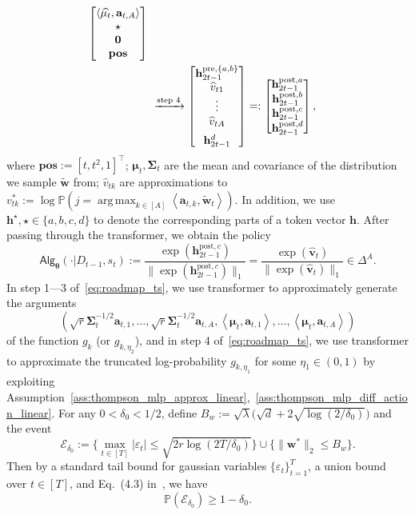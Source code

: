 \documentclass[10pt]{article}
\renewcommand{\hat}{\widehat}
\newcommand{\eps}{\varepsilon}
\DeclareMathOperator*{\argmax}{arg\,max}
\newcommand{\<}{\left\langle}
\renewcommand{\>}{\right\rangle}
\newcommand{\bzero}{{\mathbf 0}}
\renewcommand{\P}{\mathbb{P}}
\newcommand{\pre}{{\mathrm{pre}}}
\newcommand{\posv}{{\mathbf{pos}}}
\newcommand{\post}{{\mathrm{post}}}
\newcommand{\parta}{{a}}
\newcommand{\partb}{{b}}
\newcommand{\partc}{{c}}
\newcommand{\partd}{{d}}
\newcommand{\Tpsmean}{{{\mathbf\mu}}}
\newcommand{\Tpscov}{{{\mathbf\Sigma}}}
\newcommand{\Tpssam}{{\tilde\bw}}
\newcommand{\Tpsparn}{{r}}
\newcommand{\trunprob}{{\eta_1}}
\newcommand{\hpevent}{{\mathcal E}}
\newcommand{\Trunregpa}{{\eta_2}}
\newcommand{\state}{{s}}
\newcommand{\totlen}{{T}}
\newcommand{\sAlg}{{\mathsf{Alg}}}
\newcommand{\dset}{{D}}
\newcommand{\tfpar}{{\btheta}}
\def\btheta{{\boldsymbol \theta}}
\def\ba{{\mathbf a}}
\def\bh{{\mathbf h}}
\def\bv{{\mathbf v}}
\def\bw{{\mathbf w}}
\begin{document}
\begin{align}
\begin{bmatrix}
        \<\widehat{\Tpsmean_t},\ba_{t,A}\>
        \\
        \star\\ \bzero \\\posv
\end{bmatrix}
\\ &~\xrightarrow{\text{step 4}}
\begin{bmatrix}
    \bh_{2t-1}^{\pre,\{\parta,\partb\}}\\ \hat v_{t1}\\\vdots\\ \hat{v}_{tA} \vspace{0.5em}\\ \bh_{2t-1}^{\partd}
\end{bmatrix}
=:
\begin{bmatrix}
    \bh_{2t-1}^{\post,\parta} \\  \bh_{2t-1}^{\post,\partb}\\  \bh_{2t-1}^{\post,\partc}\\   \bh_{2t-1}^{\post,\partd}
\end{bmatrix},\notag
\end{align}
where $\posv:=[t,t^2,1]^\top$; $\Tpsmean_t,\Tpscov_t$ are the mean and covariance of the distribution we sample $\tilde\bw$ from; $\hat v_{tk}$ are approximations to $v^*_{tk}:=\log \P(j=\argmax_{k\in[A]}\<\ba_{t,k},\Tpssam_t\>)$. In addition, we use $\bh^\star,\star\in\{\parta,\partb,\partc,\partd\}$ to denote the corresponding parts of a token vector $\bh$. After passing through the transformer, we obtain the policy
$$
\sAlg_\tfpar(\cdot|\dset_{t-1},\state_t):=\frac{\exp(\bh^{\post,\partc}_{2t-1})}{\|\exp(\bh^{\post,\partc}_{2t-1})\|_1}=\frac{\exp(\hat \bv_t)}{\|\exp(\hat \bv_t)\|_1}\in\Delta^A.
$$
In step 1---3 of~\eqref{eq:roadmap_ts},  we use transformer to approximately generate the arguments $$(\sqrt{\Tpsparn}\Tpscov_t^{-1/2}\ba_{t,1},\ldots,\sqrt{\Tpsparn}\Tpscov_t^{-1/2}\ba_{t,A},\<\Tpsmean_t,\ba_{t,1}\>,\ldots,\<\Tpsmean_t,\ba_{t,A}\>)$$ of the function $g_k$ (or $g_{k,\Trunregpa}$), and in step 4 of~\eqref{eq:roadmap_ts}, we use transformer to approximate the truncated log-probability $g_{k,\trunprob}$ for some $\trunprob\in(0,1)$ by exploiting Assumption~\ref{ass:thompson_mlp_approx_linear},~\ref{ass:thompson_mlp_diff_action_linear}.
For any $0<\delta_0<1/2$, define $B_w:=\sqrt{\lambda}\big(\sqrt{d}+2\sqrt{\log(2/\delta_0)}\big)$ and the event $$\hpevent_{\delta_0}:=\{\max_{t\in[T]}|\eps_t|\leq\sqrt{2\Tpsparn\log(2T/\delta_0)}\}\cup \{\|\bw^*\|_2\leq  B_w\}.$$ Then by  a standard tail bound for gaussian variables $\{\eps_t\}_{t=1}^\totlen$,  a union bound over $t\in[T]$, and Eq.~(4.3) in~\cite{laurent2000adaptive}, we have $$\P(\hpevent_{\delta_0})\geq 1-{\delta_0}.$$
\end{document}
